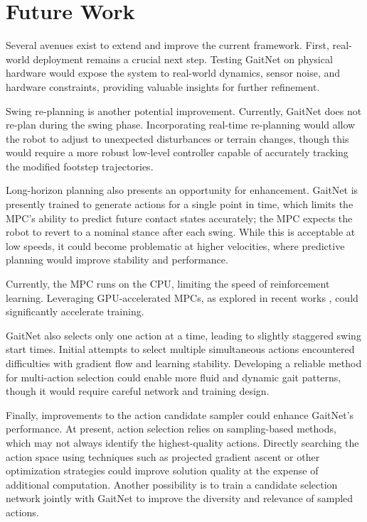 \section{Future Work}

Several avenues exist to extend and improve the current framework.
First, real-world deployment remains a crucial next step. Testing
GaitNet on physical hardware would expose the system to real-world
dynamics, sensor noise, and hardware constraints, providing valuable
insights for further refinement.

Swing re-planning is another potential improvement. Currently,
GaitNet does not re-plan during the swing phase. Incorporating
real-time re-planning would allow the robot to adjust to unexpected
disturbances or terrain changes, though this would require a more
robust low-level controller capable of accurately tracking the
modified footstep trajectories.

Long-horizon planning also presents an opportunity for enhancement.
GaitNet is presently trained to generate actions for a single point
in time, which limits the MPC's ability to predict future contact
states accurately; the MPC expects the robot to revert to a
nominal stance after each swing. While this is acceptable at low
speeds, it could become problematic at higher velocities, where
predictive planning would improve stability and performance.

Currently, the MPC runs on the CPU, limiting the speed of
reinforcement learning. Leveraging GPU-accelerated MPCs, as explored
in recent works \cite{todo}, could significantly accelerate training.

GaitNet also selects only one action at a time, leading to slightly
staggered swing start times. Initial attempts to
select multiple simultaneous actions encountered difficulties with
gradient flow and learning stability. Developing a reliable method
for multi-action selection could enable more fluid and dynamic gait
patterns, though it would require careful network and training design.

Finally, improvements to the action candidate sampler could enhance
GaitNet's performance. At present, action selection relies on
sampling-based methods, which may not always identify the
highest-quality actions. Directly searching the action space using
techniques such as projected gradient \cite{todo} ascent or other optimization
strategies could improve solution quality at the expense of
additional computation. Another possibility is to train a candidate
selection network jointly with GaitNet to improve the diversity and
relevance of sampled actions.
